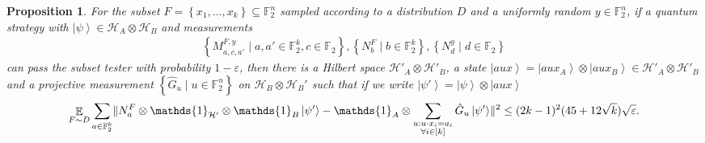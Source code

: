 \documentclass[10pt,a4paper]{article}
\theoremstyle{plain}
\newtheorem{prop}[theorem]{Proposition}
\theoremstyle{definition}
\newcommand {\set} [1] {\ensuremath{ \left\lbrace #1 \right\rbrace }}
\DeclarePairedDelimiter{\norm}{\lVert}{\rVert}
\newcommand {\ket} [1] {\ensuremath{ \left| #1 \right\rangle }}
\DeclareMathOperator*{\bigE}{\mathbb{E}}
\newcommand {\id} {\ensuremath{\mathds{1}}}
\newcommand{\ep} {\ensuremath{\varepsilon}}
\newcommand{\x}{\otimes}
\newcommand{\calH}{\mathcal{H}}
\newcommand{\1}{\mathbb{1}} %
\newcommand{\bF}{\mathbb{F}}
\begin{document}
\begin{prop}
	\label{prop:subset_test}
    For the subset $F = \set{x_1,\ldots,x_k} \subseteq \bF_2^n$ sampled according to a distribution $D$ and a uniformly random $y \in \bF_2^n$, 
	if a quantum strategy with $\ket{\psi} \in \calH_A \x \calH_B$ and measurements
	\begin{align*}
	\set{ M^{F,y}_{a, c, a'} \mid a,a' \in \bF_2^k, c \in \bF_2}, \set{N^F_b \mid b \in \bF_2^k}, \set{ N^y_d \mid d \in \bF_2 }
	\end{align*}
	can pass the subset tester with probability $1 - \ep$, then there is a Hilbert space $\calH'_A \x \calH'_B$,
	a state $\ket{aux} = \ket{aux_A} \x \ket{aux_B} \in \calH'_A \x \calH'_B$ and a projective measurement $\set{ \hat{G}_u \mid u \in \bF_2^n }$
	on $\calH_B \x \calH_B'$
	such that if we write $\ket{\psi'} = \ket{\psi} \x \ket{aux}$
	\begin{align*}
		\bigE_{F \sim D} \sum_{a \in \bF_2^k} \norm{ N^F_a \x \id_{\calH'} \x \id_B \ket{\psi'} - \id_A \x \sum_{\substack{u: u\cdot x_i = a_i\\\forall i \in [k]}} \hat{G}_u \ket{\psi'}}^2 \leq  (2k-1)^2 (45+ 12\sqrt{k}) \sqrt{\ep}. 
	\end{align*}
\end{prop}
\end{document}
